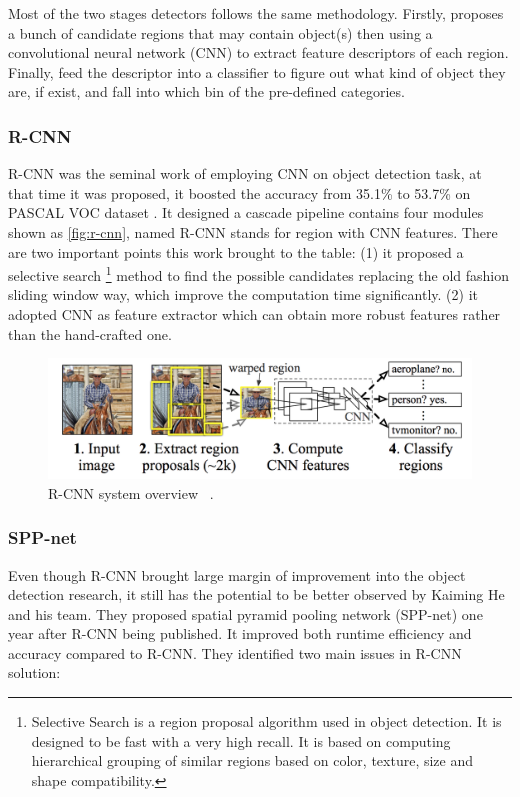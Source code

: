 Most of the two stages detectors follows the same methodology. Firstly,
proposes a bunch of candidate regions that may contain object(s) then using a
convolutional neural network (CNN) to extract feature descriptors of each
region.
Finally, feed the descriptor into a classifier to figure out what kind of 
object they are, if exist, and fall into which bin of the pre-defined
categories.

\subsubsection{R-CNN}

R-CNN was the seminal work of employing CNN on object detection task, at that
time it was proposed, it boosted the accuracy from 35.1\% to 53.7\% on PASCAL
VOC dataset \cite{r-cnn-paper-2013}.
It designed a cascade pipeline contains four modules shown as
\autoref{fig:r-cnn}, named R-CNN stands for region with CNN features.
There are two important points this work brought to the table:
(1) it proposed a selective search 
\footnote{Selective Search is a region 
proposal algorithm used in object detection. It is designed to be fast with a 
very high recall. It is based on computing hierarchical grouping of similar 
regions based on color, texture, size and shape compatibility.} 
method to find the possible candidates
replacing the old fashion sliding window way,
which improve the computation time significantly.
(2) it adopted CNN as feature extractor which can obtain more robust
features rather than the hand-crafted one.

\begin{figure}
    \includegraphics[width=\linewidth]{figures/r_cnn.png}
    \caption{R-CNN system overview ~\protect\cite{r-cnn-paper-2013}.}
    \label{fig:r-cnn}
\end{figure}

\subsubsection{SPP-net}

Even though R-CNN brought large margin of improvement into the object detection
research, it still has the potential to be better observed by Kaiming He and
his team. They proposed spatial pyramid pooling network (SPP-net)
\cite{spp-net-paper-2014} one year after R-CNN being published. It improved
both runtime efficiency and accuracy compared to R-CNN.
They identified two main issues in R-CNN solution:

